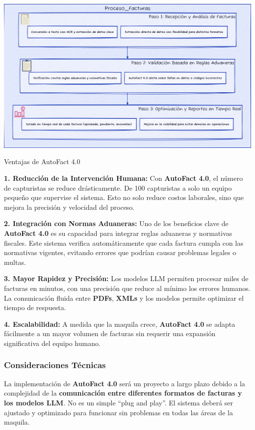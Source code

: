 \documentclass[
  10pt,
  letterpaper,
]{book}
\begin{document}
\includegraphics[width=1\textwidth,height=\textheight]{index_files/mediabag/diagram-5.pdf}

Ventajas de AutoFact 4.0

\textbf{1. Reducción de la Intervención Humana:} Con \textbf{AutoFact
4.0}, el número de capturistas se reduce drásticamente. De 100
capturistas a solo un equipo pequeño que supervise el sistema. Esto no
solo reduce costos laborales, sino que mejora la precisión y velocidad
del proceso.

\textbf{2. Integración con Normas Aduaneras:} Uno de los beneficios
clave de \textbf{AutoFact 4.0} es su capacidad para integrar reglas
aduaneras y normativas fiscales. Este sistema verifica automáticamente
que cada factura cumpla con las normativas vigentes, evitando errores
que podrían causar problemas legales o multas.

\textbf{3. Mayor Rapidez y Precisión:} Los modelos LLM permiten procesar
miles de facturas en minutos, con una precisión que reduce al mínimo los
errores humanos. La comunicación fluida entre \textbf{PDFs},
\textbf{XMLs} y los modelos permite optimizar el tiempo de respuesta.

\textbf{4. Escalabilidad:} A medida que la maquila crece,
\textbf{AutoFact 4.0} se adapta fácilmente a un mayor volumen de
facturas sin requerir una expansión significativa del equipo humano.

\subsubsection{Consideraciones
Técnicas}\label{consideraciones-tuxe9cnicas}

La implementación de \textbf{AutoFact 4.0} será un proyecto a largo
plazo debido a la complejidad de la \textbf{comunicación entre
diferentes formatos de facturas y los modelos LLM}. No es un simple
``plug and play''. El sistema deberá ser ajustado y optimizado para
funcionar sin problemas en todas las áreas de la maquila.
\end{document}
